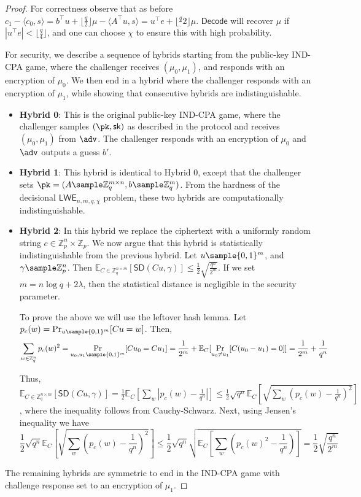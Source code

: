 \documentclass[12pt]{tufte-book}
\newcommand{\LWE}{\mathsf{LWE}} \usepackage{booktabs}
\begin{document}
\begin{proof}
    For correctness observe that as before $c_1 - \langle c_0, s\rangle = b^\intercal u + \lfloor\frac{q}{2}\rfloor\mu - \langle A^\intercal u, s\rangle = u^\intercal e + \lfloor\frac{q}.{2}\rfloor\mu$. $\mathsf{Decode}$ will recover $\mu$ if $|u^\intercal e| < \lfloor\frac{q}{4}\rfloor$, and one can choose $\chi$ to ensure this with high probability.

    For security, we describe a sequence of hybrids starting from the public-key IND-CPA game, where the challenger receives $(\mu_0, \mu_1)$, and responds with an encryption of $\mu_0$. We then end in a hybrid where the challenger responds with an encryption of $\mu_1$, while showing that consecutive hybrids are indistinguishable.

    \begin{itemize}
        \item \textbf{Hybrid 0}: This is the original public-key IND-CPA game, where the challenger samples $(\pk, \sk)$ as described in the protocol and receives $(\mu_0, \mu_1)$ from $\adv$. The challenger responds with an encryption of $\mu_0$ and $\adv$ outputs a guess $b'$.
        \item \textbf{Hybrid 1}: This hybrid is identical to Hybrid 0, except that the challenger sets $\pk = (A \sample \mathbb{Z}_q^{m \times n}, b \sample \mathbb{Z}_q^m)$. From the hardness of the decisional $\LWE_{n,m,q,\chi}$ problem, these two hybrids are computationally indistinguishable.
        \item \textbf{Hybrid 2}: In this hybrid we replace the ciphertext with a uniformly random string $c\in \mathbb{Z}_p^{n} \times \mathbb{Z}_p$. We now argue that this hybrid is statistically indistinguishable from the previous hybrid. Let $u \sample \{0,1\}^m$, and $\gamma \sample \mathbb{Z}_p^n$. Then $\mathbb{E}_{C \in \mathbb{Z}_q^{n \times m}}[\mathsf{SD}(C u, \gamma)] \leq \frac{1}{2} \sqrt{\frac{q^n}{2^m}}$. If we set $m = n \log{q} + 2\lambda$, then the statistical distance is negligible in the security parameter.

              To prove the above we will use the leftover hash lemma. Let $p_c(w) = \Pr_{u \sample \{0,1\}^m} [C u = w]$. Then,
              \[\sum_{w \in \mathbb{Z}_q^n} p_c(w)^2 = \Pr_{u_0, u_1 \sample \{0,1\}^m} [Cu_0 = Cu_1] = \frac{1}{2^m} + \mathbb{E}_C[\Pr_{u_0 \neq u_1}[C(u_0 - u_1) = 0]] = \frac{1}{2^m} + \frac{1}{q^n} \]

              Thus, $\mathbb{E}_{C \in \mathbb{Z}_q^{n \times m}}[\mathsf{SD}(C u, \gamma)] = \frac{1}{2}\mathbb{E}_{C}[\sum_w |p_c(w) - \frac{1}{q^n}|]\leq \frac{1}{2}\sqrt{q^n}\mathbb{E}_{C}\left[ \sqrt{\sum_w (p_c(w) - \frac{1}{q^n})^2} \right]$,
              where the inequality follows from Cauchy-Schwarz. Next, using Jensen's inequality we have
              \[ \frac{1}{2}\sqrt{q^n}\mathbb{E}_C\left[ \sqrt{\sum_w (p_c(w) - \frac{1}{q^n})^2}\right] \leq \frac{1}{2}\sqrt{q^n}\sqrt{\mathbb{E}_C \left[\sum_w (p_c(w)^2 - \frac{1}{q^n})\right] } = \frac{1}{2}\sqrt{\frac{q^n}{2^m}}\]
    \end{itemize}
    The remaining hybrids are symmetric to end in the IND-CPA game with challenge response set to an encryption of $\mu_1$.
\end{proof}
\end{document}

